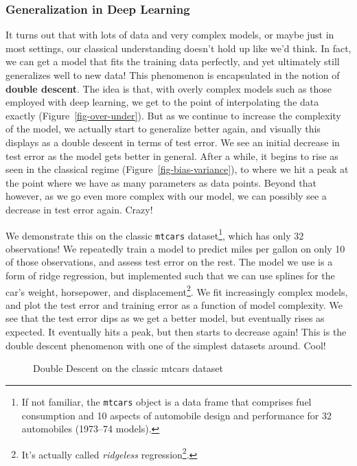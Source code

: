 \documentclass[
  letterpaper,
]{krantz}
\DeclareRobustCommand{\href}[2]{#2\footnote{\url{#1}}}
\begin{document}
\subsubsection{Generalization in Deep
Learning}\label{generalization-in-deep-learning}

It turns out that with lots of data and very complex models, or maybe
just in most settings, our classical understanding doesn't hold up like
we'd think. In fact, we can get a model that fits the training data
perfectly, and yet ultimately still generalizes well to new data! This
phenomenon is encapsulated in the notion of \textbf{double descent}. The
idea is that, with overly complex models such as those employed with
deep learning, we get to the point of interpolating the data exactly
(Figure~\ref{fig-over-under}). But as we continue to increase the
complexity of the model, we actually start to generalize better again,
and visually this displays as a double descent in terms of test error.
We see an initial decrease in test error as the model gets better in
general. After a while, it begins to rise as seen in the classical
regime (Figure~\ref{fig-bias-variance}), to where we hit a peak at the
point where we have as many parameters as data points. Beyond that
however, as we go even more complex with our model, we can possibly see
a decrease in test error again. Crazy!

We demonstrate this on the classic \texttt{mtcars} dataset\footnote{If
  not familiar, the \texttt{mtcars} object is a data frame that
  comprises fuel consumption and 10 aspects of automobile design and
  performance for 32 automobiles (1973--74 models).}, which has only 32
observations! We repeatedly train a model to predict miles per gallon on
only 10 of those observations, and assess test error on the rest. The
model we use is a form of ridge regression, but implemented such that we
can use splines for the car's weight, horsepower, and
displacement\footnote{It's actually called
  \href{https://www.stat.berkeley.edu/~ryantibs/statlearn-s23/lectures/ridgeless.pdf}{\emph{ridgeless}
  regression}.}. We fit increasingly complex models, and plot the test
error and training error as a function of model complexity. We see that
the test error dips as we get a better model, but eventually rises as
expected. It eventually hits a peak, but then starts to decrease again!
This is the double descent phenomenon with one of the simplest datasets
around. Cool!

\begin{figure}[H]


\caption{\label{fig-double-descent}Double Descent on the classic mtcars
dataset}

\end{figure}%
\end{document}
